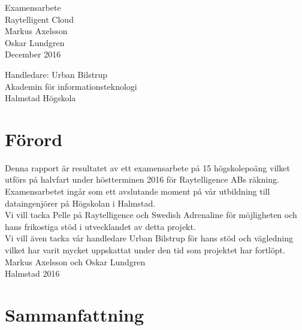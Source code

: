 \documentclass[12pt,a4paper,twoside,openright]{report}
\begin{document}
\sloppy

\begin{titlepage}
    \centering
    \vfill
    {\Huge{
        Examensarbete}\\
        \vspace{1cm}
        \Large{Raytelligent Cloud\\}
        \vskip1cm
        Markus Axelsson\\
        Oskar Lundgren\\
        \vspace{5mm}
        December 2016
    }    
    \vfill
    \vfill

    \begin{center}
        Handledare: Urban Bilstrup\\
        Akademin för informationsteknologi\\
        Halmstad Högskola
    \end{center}
\end{titlepage}
\thispagestyle{empty}

\newpage\phantom{}
\thispagestyle{empty}

\newpage\phantom{}
\thispagestyle{empty}

\newpage\phantom{}
\thispagestyle{empty}

\clearpage
\onecolumn
{}
\section*{Förord}
Denna rapport är resultatet av ett examensarbete på 15 högskolepoäng vilket utförs på halvfart under höstterminen 2016 för Raytelligence ABs räkning. Examensarbetet ingår som ett avslutande moment på vår utbildning till dataingenjörer på Högskolan i Halmstad.\\
\newline
Vi vill tacka Pelle på Raytelligence och Swedish Adrenaline för möjligheten och hans frikostiga stöd i utvecklandet av detta projekt.\\
\newline
Vi vill även tacka vår handledare Urban Bilstrup för hans stöd och vägledning vilket har varit mycket uppskattat under den tid som projektet har fortlöpt.\\
\newline
Markus Axelsson och Oskar Lundgren\\
Halmstad 2016

\newpage
\newpage\null\newpage
\section*{Sammanfattning}
\end{document}
